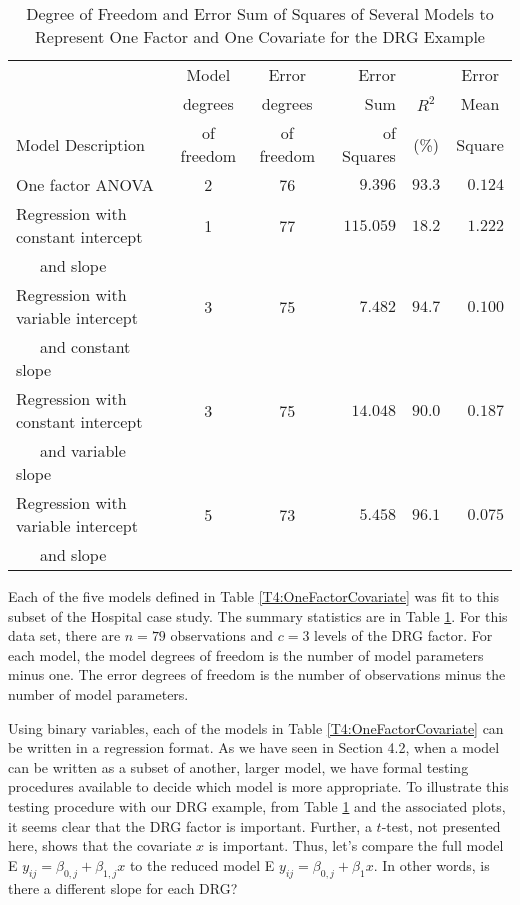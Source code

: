   \begin{center}  \begin{table}[h]
\caption{\label{T4:DRGModels} Degree of Freedom and Error Sum of
Squares of Several Models to Represent One Factor and One Covariate
for the DRG Example}
\begin{tabular}{lccrcc}
\hline & Model & Error & Error  &  & Error  \\
& degrees & degrees
& Sum & $R^2$  & Mean \\
Model Description & of freedom & of freedom & of Squares & (\%) &
Square
\\ \hline
One factor ANOVA & 2 &
76 & \multicolumn{1}{r}{$9.396$} & \multicolumn{1}{r}{$%
93.3$} & \multicolumn{1}{r}{$0.124$} \\
Regression with constant intercept & 1 & 77 &
\multicolumn{1}{r}{$115.059$} &
\multicolumn{1}{r}{$18.2$} & \multicolumn{1}{r}{$1.222$} \\
~~~and slope & & & & &  \\
Regression with variable intercept &3 & 75 &
\multicolumn{1}{r}{$7.482$} &
\multicolumn{1}{r}{$94.7$} & \multicolumn{1}{r}{$0.100$} \\
~~~and constant slope &  & &  &  &  \\
Regression with constant intercept & 3 & 75 &
\multicolumn{1}{r}{$14.048$} &
\multicolumn{1}{r}{$90.0$} & \multicolumn{1}{r}{$0.187$} \\
~~~and variable slope &  &  &  &  & \\
Regression with variable intercept & 5 & 73 &
\multicolumn{1}{r}{$5.458$} &
\multicolumn{1}{r}{$96.1$} & \multicolumn{1}{r}{$0.075$} \\
~~~and slope &  & & &  &  \\
\hline
\end{tabular}

\end{table}  \end{center} 


Each of the five models defined in Table \ref{T4:OneFactorCovariate}
was fit to this subset of the Hospital case study. The summary
statistics are in Table \ref{T4:DRGModels}. For this data set, there
are $n=79$ observations and $c=3$ levels of the DRG factor. For each
model, the model degrees of freedom is the number of model
parameters minus one. The error degrees of freedom is the number of
observations minus the number of model parameters.


Using binary variables, each of the models in Table
\ref{T4:OneFactorCovariate} can be written in a regression format.
As we have seen in Section 4.2, when a model can be written as a
subset of another, larger model, we have formal testing procedures
available to decide which model is more appropriate. To illustrate
this testing procedure with our DRG example, from Table
\ref{T4:DRGModels} and the associated plots, it seems clear that the
DRG factor is important. Further, a $t$-test, not presented here,
shows that the
covariate $x$ is important. Thus, let's compare the full model E $%
y_{ij}=\beta _{0,j}+\beta _{1,j}x$ to the reduced model E
$y_{ij}=\beta _{0,j}+\beta _{1}x$. In other words, is there a
different slope for each DRG?


